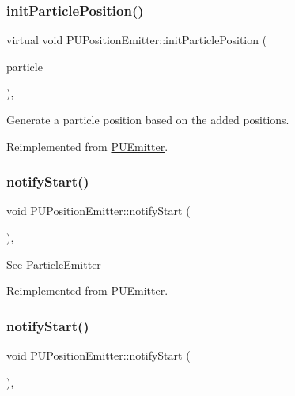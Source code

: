\subsubsection{\texorpdfstring{init\+Particle\+Position()}{initParticlePosition()}\hspace{0.1cm}{\footnotesize\ttfamily [2/2]}}
{\footnotesize\ttfamily virtual void P\+U\+Position\+Emitter\+::init\+Particle\+Position (\begin{DoxyParamCaption}\item[{\hyperlink{structPUParticle3D}{P\+U\+Particle3D} $\ast$}]{particle }\end{DoxyParamCaption})\hspace{0.3cm}{\ttfamily [override]}, {\ttfamily [virtual]}}

Generate a particle position based on the added positions. 

Reimplemented from \hyperlink{classPUEmitter_a2449f31b73c94a55f6559be71d56ca61}{P\+U\+Emitter}.

\mbox{\label{classPUPositionEmitter_ae71cdf6eae8f3dc4d66baace5d9785ba}} 
\subsubsection{\texorpdfstring{notify\+Start()}{notifyStart()}\hspace{0.1cm}{\footnotesize\ttfamily [1/2]}}
{\footnotesize\ttfamily void P\+U\+Position\+Emitter\+::notify\+Start (\begin{DoxyParamCaption}\item[{void}]{ }\end{DoxyParamCaption})\hspace{0.3cm}{\ttfamily [override]}, {\ttfamily [virtual]}}

See Particle\+Emitter 

Reimplemented from \hyperlink{classPUEmitter}{P\+U\+Emitter}.

\mbox{\label{classPUPositionEmitter_ae71cdf6eae8f3dc4d66baace5d9785ba}} 
\subsubsection{\texorpdfstring{notify\+Start()}{notifyStart()}\hspace{0.1cm}{\footnotesize\ttfamily [2/2]}}
{\footnotesize\ttfamily void P\+U\+Position\+Emitter\+::notify\+Start (\begin{DoxyParamCaption}\item[{void}]{ }\end{DoxyParamCaption})\hspace{0.3cm}{\ttfamily [override]}, {\ttfamily [virtual]}}

